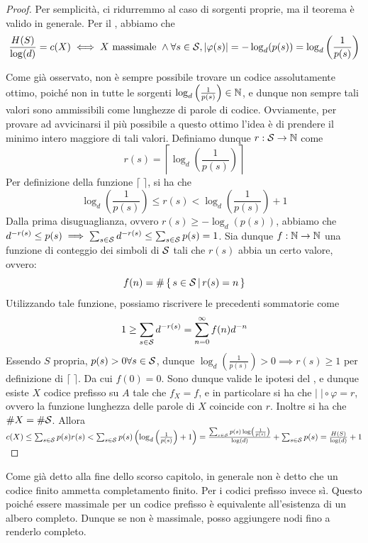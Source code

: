 \begin{proof}
  Per semplicità, ci ridurremmo al caso di sorgenti proprie, ma il teorema è valido in generale.
  Per il , abbiamo che 
  \[\frac{H(S)}{\log(d)} = c(X) \iff X \text{ massimale }\land \forall s \in \mathcal{S}, \left|\varphi(s)\right|=-\log_d(p(s))=\log_d\left(\frac{1}{p(s)}\right)\]

  Come già osservato, non è sempre possibile trovare un codice assolutamente ottimo, poiché non in tutte le sorgenti \(\log_d\left(\frac{1}{p(s)}\right) \in \mathbb{N}\), e dunque non sempre tali valori sono ammissibili come lunghezze di parole di codice.
  Ovviamente, per provare ad avvicinarsi il più possibile a questo ottimo l'idea è di prendere il minimo intero maggiore di tali valori.
  Definiamo dunque \(r: \mathcal{S} \to \mathbb{N}\) come
  \[r(s) = \left\lceil \log_d\left(\frac{1}{p(s)}\right) \right\rceil\]
  Per definizione della funzione \(\lceil\;\rceil\), si ha che
  \[\log_d\left(\frac{1}{p(s)}\right) \leq r(s) < \log_d\left(\frac{1}{p(s)}\right) + 1\]
  Dalla prima disuguaglianza, ovvero \(r(s) \geq -\log_d(p(s))\), abbiamo che \(d^{-r(s)} \leq p(s)\implies \sum_{s\in\mathcal{S}} d^{-r(s)} \leq \sum_{s\in\mathcal{S}} p(s) = 1\).
  Sia dunque \(f: \mathbb{N} \to \mathbb{N}\) una funzione di conteggio dei simboli di \(\mathcal{S}\) tali che \(r(s)\) abbia un certo valore, ovvero:
  \[f(n) = \#\set{s \in \SCal}[r(s) = n]\]
  Utilizzando tale funzione, possiamo riscrivere le precedenti sommatorie come
  \[1 \geq \sum_{s\in\mathcal{S}} d^{-r(s)} = \sum_{n=0}^{\infty} f(n)d^{-n}\]
  Essendo \(S\) propria, \(p(s) > 0 \forall s \in \mathcal{S}\), dunque \(\log_d\left(\frac{1}{p(s)}\right)>0 \implies r(s) \geq 1\) per definizione di \(\lceil\;\rceil\).
  Da cui \(f(0) = 0\). Sono dunque valide le ipotesi del , e dunque esiste \(X\) codice prefisso su \(A\) tale che \(f_X = f\), e in particolare si ha che \(\lvert\; \rvert \circ \varphi = r\), ovvero la funzione lunghezza delle parole di \(X\) coincide con \(r\).
  Inoltre si ha che \(\# X = \# \mathcal{S}\). Allora
  \(c(X) \leq \sum_{s\in\mathcal{S}} p(s)r(s) < \sum_{s\in\mathcal{S}} p(s)\left(\log_d\left(\frac{1}{p(s)}\right) + 1\right) = \frac{\sum_{s\in\mathcal{S}} p(s)\log\left(\frac{1}{p(s)}\right)}{\log(d)} + \sum_{s\in\mathcal{S}} p(s) = \frac{H(S)}{\log(d)} + 1\)
\end{proof}

\begin{observation}{}
  Come già detto alla fine dello scorso capitolo, in generale non è detto che un codice finito ammetta completamento finito.
  Per i codici prefisso invece sì. Questo poiché essere massimale per un codice prefisso è equivalente all'esistenza di un albero completo.
  Dunque se non è massimale, posso aggiungere nodi fino a renderlo completo.
\end{observation}

